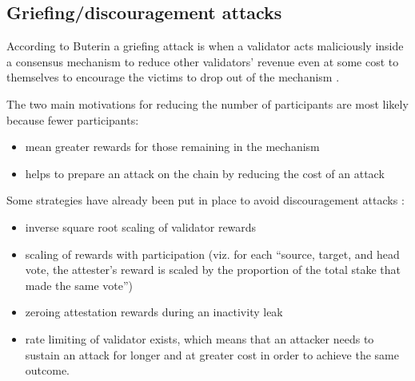 \documentclass[UTF8]{article}
\begin{document}
%
%

\subsection{Griefing/discouragement attacks}
According to Buterin a griefing attack is when a validator acts maliciously inside a consensus mechanism to reduce other validators' revenue even at some cost to themselves to encourage the victims to drop out of the mechanism \cite{buterin2018c}.

The two main motivations for reducing the number of participants are most likely because fewer participants:
\begin{itemize}
\item mean greater rewards for those remaining in the mechanism
\item helps to prepare an attack on the chain by reducing the cost of an attack
\end{itemize}

Some strategies have already been put in place to avoid discouragement attacks \cite{Edgington2023}:
\begin{itemize}
\item inverse square root scaling of validator rewards
\item scaling of rewards with participation (viz. for each ``source, target, and head vote, the attester's reward is scaled by the proportion of the total stake that made the same vote'')
\item zeroing attestation rewards during an inactivity leak
\item rate limiting of validator exists, which means that an attacker needs to sustain an attack for longer and at greater cost in order to achieve the same outcome.
\end{itemize}
\end{document}
